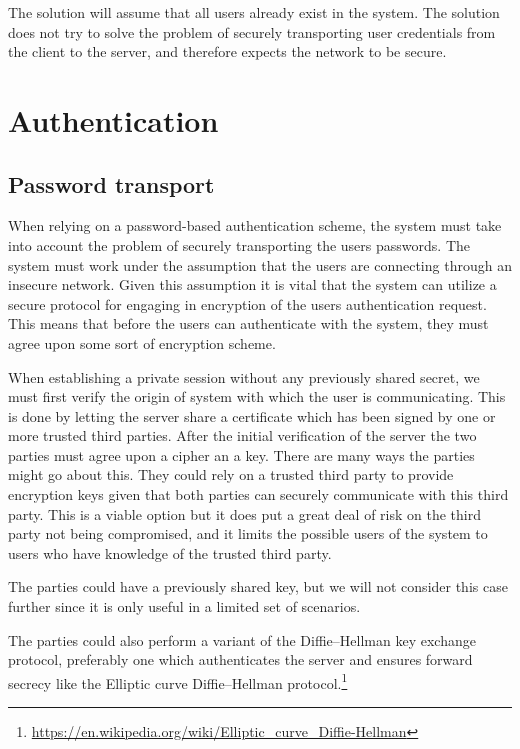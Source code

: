 \documentclass[12pt]{article}
\begin{document}
The solution will assume that all users already exist in the system.
The solution does not try to solve the problem of securely transporting user credentials from the client to the server, and therefore expects the network to be secure.

\newpage

\section{Authentication}
\label{sec:Authentication}

\subsection{Password transport}
\label{sub:Password transport}

When relying on a password-based authentication scheme, the system must take into account the problem of securely transporting the users passwords. The system must work under the assumption that the users are connecting through an insecure network. Given this assumption it is vital that the system can utilize a secure protocol for engaging in encryption of the users authentication request. This means that before the users can authenticate with the system, they must agree upon some sort of encryption scheme.

When establishing a private session without any previously shared secret, we must first verify the origin of system with which the user is communicating. This is done by letting the server share a certificate which has been signed by one or more trusted third parties.
After the initial verification of the server the two parties must agree upon a cipher an a key. There are many ways the parties might go about this.
They could rely on a trusted third party to provide encryption keys given that both parties can securely communicate with this third party. This is a viable option but it does put a great deal of risk on the third party not being compromised, and it limits the possible users of the system to users who have knowledge of the trusted third party.

The parties could have a previously shared key, but we will not consider this case further since it is only useful in a limited set of scenarios.

The parties could also perform a variant of the Diffie–Hellman key exchange protocol, preferably one which authenticates the server and ensures forward secrecy like the Elliptic curve Diffie–Hellman protocol.\footnote{\url{https://en.wikipedia.org/wiki/Elliptic_curve_Diffie-Hellman}}
\end{document}
